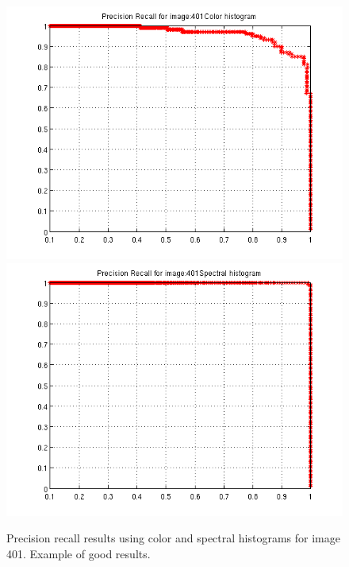 \documentclass[a4paper,12pt]{article}
\begin{document}
\begin{figure}[h!]
    \centering
    \includegraphics[totalheight=.24\textheight]{../Results/PR/GoodColor.png}
    \includegraphics[totalheight=.24\textheight]{../Results/PR/GoodSpectral.png}
    \caption{Precision recall results using color and spectral histograms 
    for image 401. Example of good results. }
    \label{fig:good}
\end{figure}
\end{document}
